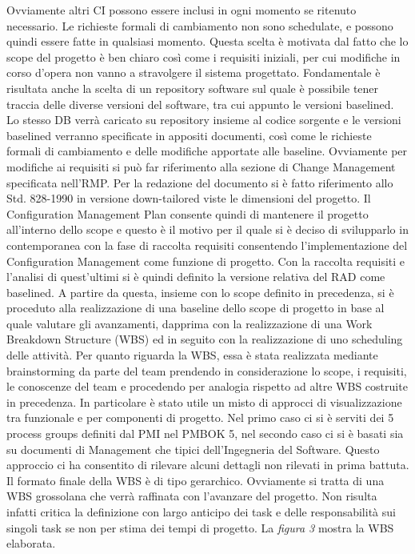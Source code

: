 Ovviamente altri CI possono essere inclusi in ogni momento se ritenuto necessario.
Le richieste formali di cambiamento non sono schedulate, e possono quindi essere fatte in qualsiasi momento. Questa scelta \`{e} motivata dal fatto che lo scope del progetto \`{e} ben chiaro cos\`{i} come i requisiti iniziali, per cui modifiche in corso d\rq opera non vanno a stravolgere il sistema progettato.
Fondamentale \`{e} risultata anche la scelta di un repository software sul quale \`{e} possibile tener traccia delle diverse versioni del software, tra cui appunto le versioni baselined. Lo stesso DB verr\`{a} caricato su repository insieme al codice sorgente e le versioni baselined verranno specificate in appositi documenti, cos\`{i} come le richieste formali di cambiamento e delle modifiche apportate alle baseline.
Ovviamente per modifiche ai requisiti si pu\`{o} far riferimento alla sezione di Change Management specificata nell\rq RMP.
Per la redazione del documento si \`{e} fatto riferimento allo Std. 828-1990 in versione down-tailored viste le dimensioni del progetto.
Il Configuration Management Plan consente quindi di mantenere il progetto all\rq interno dello scope e questo \`{e} il motivo per il quale si \`{e} deciso di svilupparlo in contemporanea con la fase di raccolta requisiti consentendo l\rq implementazione del Configuration Management come funzione di progetto.
Con la raccolta requisiti e l\rq analisi di quest\rq ultimi si \`{e} quindi definito la versione relativa del RAD come baselined.
A partire da questa, insieme con lo scope definito in precedenza, si \`{e} proceduto alla realizzazione di una baseline dello scope di progetto in base al quale valutare gli avanzamenti, dapprima con la realizzazione di una Work Breakdown Structure (WBS) ed in seguito con la realizzazione di uno scheduling delle attivit\`{a}.
Per quanto riguarda la WBS, essa \`{e} stata realizzata mediante brainstorming da parte del team prendendo in considerazione lo scope, i requisiti, le conoscenze del team e procedendo per analogia rispetto ad altre WBS costruite in precedenza.
In particolare \`{e} stato utile un misto di approcci di visualizzazione tra funzionale e per componenti di progetto. Nel primo caso ci si \`{e} serviti dei 5 process groups definiti dal PMI nel PMBOK 5, nel secondo caso ci si \`{e} basati sia su documenti di Management che tipici dell\rq Ingegneria del Software.
Questo approccio ci ha consentito di rilevare alcuni dettagli non rilevati in prima battuta. 
Il formato finale della WBS \`{e} di tipo gerarchico. Ovviamente si tratta di una WBS grossolana che verr\`{a} raffinata con l\rq avanzare del progetto. Non risulta infatti critica la definizione con largo anticipo dei task e delle responsabilit\`{a} sui singoli task se non per stima dei tempi di progetto.
La \emph{figura 3} mostra la WBS elaborata.

